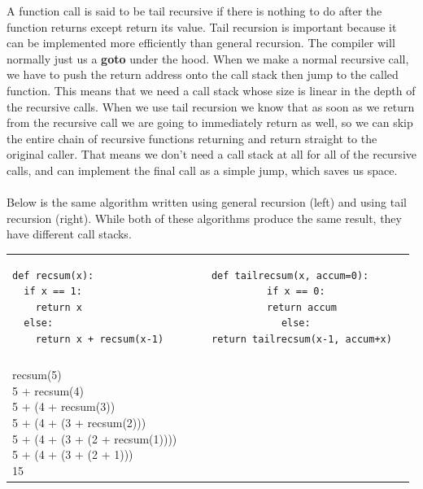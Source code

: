 \documentclass[9pt]{extarticle} %
\begin{document}
%
%
\begin{minipage}[t]{.66\linewidth} %
\vspace{-0.4cm}
\hypertarget{firstnews}{}
	A function call is said to be tail recursive if there is nothing to do after the function returns except return its value. Tail recursion is important because it can be implemented more efficiently than general recursion. The compiler will normally just us a \textbf{goto} under the hood. When we make a normal recursive call, we have to push the return address onto the call stack then jump to the called function. This means that we need a call stack whose size is linear in the depth of the recursive calls. When we use tail recursion we know that as soon as we return from the recursive call we are going to immediately return as well, so we can skip the entire chain of recursive functions returning and return straight to the original caller. That means we don't need a call stack at all for all of the	recursive calls, and can implement the final call as a simple jump, which saves us space. \\
\\
Below is the same algorithm written using general recursion (left) and using tail recursion (right). While both of these algorithms produce the same result, they have different call stacks. \\

\begin{tabular}{ l c r }
\begin{lstlisting}
def recsum(x):
  if x == 1:
    return x
  else:
    return x + recsum(x-1)
\end{lstlisting}
&
\begin{lstlisting}
def tailrecsum(x, accum=0):
  if x == 0:
    return accum
  else:
    return tailrecsum(x-1, accum+x)
\end{lstlisting}
\\
\\
\makecell{
recsum(5) \\
5 + recsum(4) \\
5 + (4 + recsum(3)) \\
5 + (4 + (3 + recsum(2))) \\
5 + (4 + (3 + (2 + recsum(1)))) \\
5 + (4 + (3 + (2 + 1))) \\
15 \\}


\end{tabular}
\end{minipage}
\end{document}
